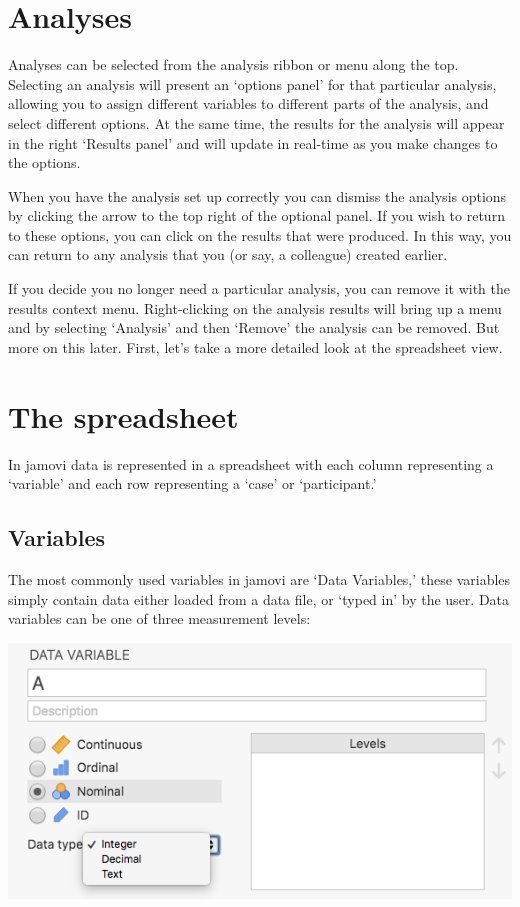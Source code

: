 \documentclass[
]{book}
\begin{document}
\hypertarget{analyses}{%
\section{Analyses}\label{analyses}}

Analyses can be selected from the analysis ribbon or menu along the top. Selecting an analysis will present an `options panel' for that particular analysis, allowing you to assign different variables to different parts of the analysis, and select different options. At the same time, the results for the analysis will appear in the right `Results panel' and will update in real-time as you make changes to the options.

When you have the analysis set up correctly you can dismiss the analysis options by clicking the arrow to the top right of the optional panel. If you wish to return to these options, you can click on the results that were produced. In this way, you can return to any analysis that you (or say, a colleague) created earlier.

If you decide you no longer need a particular analysis, you can remove it with the results context menu. Right-clicking on the analysis results will bring up a menu and by selecting `Analysis' and then `Remove' the analysis can be removed. But more on this later. First, let's take a more detailed look at the spreadsheet view.

\hypertarget{spreadsheet}{%
\section{The spreadsheet}\label{spreadsheet}}

In jamovi data is represented in a spreadsheet with each column representing a `variable' and each row representing a `case' or `participant.'

\hypertarget{variables}{%
\subsection{Variables}\label{variables}}

The most commonly used variables in jamovi are `Data Variables,' these variables simply contain data either loaded from a data file, or `typed in' by the user. Data variables can be one of three measurement levels:

\begin{center}\includegraphics[width=1\linewidth]{img/introj/measurementlevels} \end{center}
\end{document}
